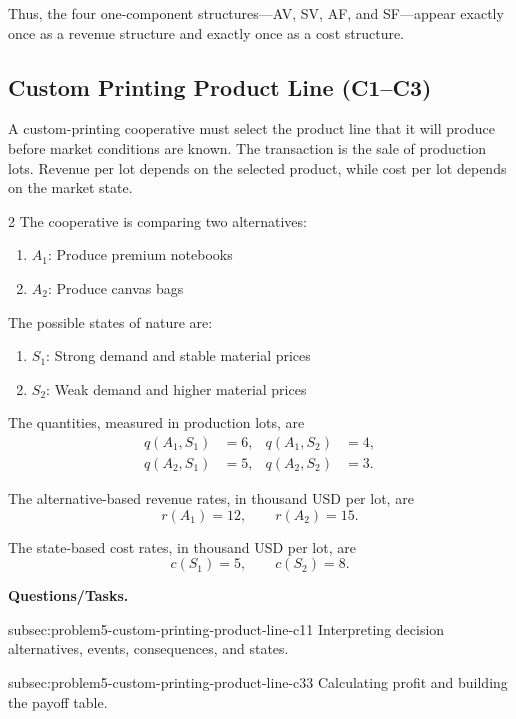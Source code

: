 Thus, the four one-component structures---AV, SV, AF, and SF---appear
exactly once as a revenue structure and exactly once as a cost structure.

\subsection{Custom Printing Product Line (C1--C3)}
\label{sec:problem5-custom-printing-product-line-c1-c3}

A custom-printing cooperative must select the product line that it will
produce before market conditions are known. The transaction is the sale of
production lots. Revenue per lot depends on the selected product, while cost
per lot depends on the market state.

\begin{multicols}{2}
	The cooperative is comparing two alternatives:
	\begin{enumerate}[label=\arabic*.]
		\item \(A_1\): Produce premium notebooks
		\item \(A_2\): Produce canvas bags
	\end{enumerate}
	
	The possible states of nature are:
	\begin{enumerate}[label=\arabic*.]
		\item \(S_1\): Strong demand and stable material prices
		\item \(S_2\): Weak demand and higher material prices
	\end{enumerate}
	
	\columnbreak
	
	The quantities, measured in production lots, are
	\[
	\begin{aligned}
		q(A_1,S_1)&=6,
		&
		q(A_1,S_2)&=4,
		\\
		q(A_2,S_1)&=5,
		&
		q(A_2,S_2)&=3.
	\end{aligned}
	\]
	
	The alternative-based revenue rates, in thousand USD per lot, are
	\[
	r(A_1)=12,
	\qquad
	r(A_2)=15.
	\]
	
	The state-based cost rates, in thousand USD per lot, are
	\[
	c(S_1)=5,
	\qquad
	c(S_2)=8.
	\]
\end{multicols}

\textbf{Questions/Tasks.}
\begin{enumerate}
	\CriterionTask
	{subsec:problem5-custom-printing-product-line-c1}{1}
	{Interpreting decision alternatives, events, consequences, and states.}

	\CriterionTask
	{subsec:problem5-custom-printing-product-line-c3}{3}
	{Calculating profit and building the payoff table.}
\end{enumerate}

